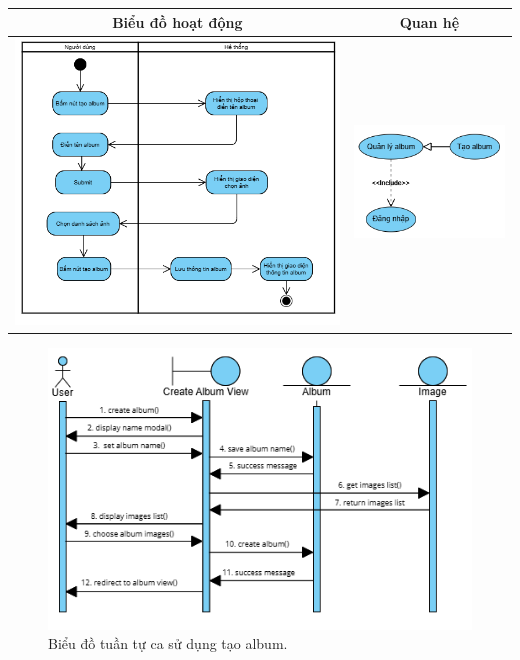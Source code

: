 \noindent 
\begin{tabular}{| c | c |}
    \hline
    \textbf{Biểu đồ hoạt động} & \textbf{Quan hệ} \\ 
    \hline
    \includegraphics[width=0.6\linewidth]{figures/c3/3-3-7-activity-diagram.png} 
    &  
    \includegraphics[width=0.35\linewidth]{figures/c3/3-3-7-relationship.png} \\ 
    \hline
\end{tabular}

\begin{figure}[H]
    \centering  
    \includegraphics[width=1\textwidth]{figures/c3/3-3-7-sequence-diagram.png}
    \caption{Biểu đồ tuần tự ca sử dụng tạo album.}
    \label{fig:3-3-7-sequence-diagram}
\end{figure}
